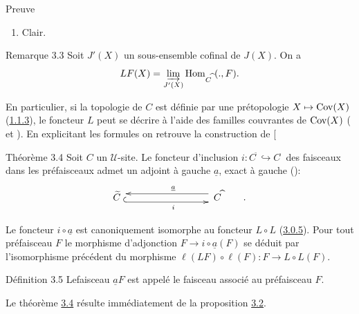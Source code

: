 \documentclass[10pt]{../fichiers-configuration-latex/smfart}
\begin{document}
\begin{enonce*}[remark]{Preuve}
\begin{enumerate}
\item Clair.
\end{enumerate}
\end{enonce*}

\begin{enonce*}[remark]{Remarque 3.3}
Soit $J'(X)$ un sous-ensemble cofinal de $J(X)$. On a
$$
LF(X)=\varinjlim_{J'(X)}\operatorname{Hom}_{C^{\widehat{\phantom{,}}}}(.,
F){}.
$$

En particulier, si la topologie de $C$ est définie par une
prétopologie $X\mapsto \operatorname{Cov}(X)$ (\hyperref[II.subsubsec1.1.3]{1.1.3}), le
foncteur $L$ peut se décrire à l'aide des familles couvrantes de
$\operatorname{Cov}(X)$ ( et ). En explicitant les
formules on retrouve la construction de [
\end{enonce*}

\begin{enonce*}{Théorème 3.4}
Soit $C$ un $𝒰$-site. Le foncteur d'inclusion
$i:C^{\widetilde{\phantom{,}}}\hookrightarrow
C^{\widehat{\phantom{,}}}$ des faisceaux dans les préfaisceaux
admet un adjoint à gauche $\underline{a}$, exact à gauche ():
\[
\xymatrix@=3cm@M=.2cm{
 \widetilde{C}  \ar @{^{(}->} @<-1ex>[r]_{i} & C^{\widehat{\phantom{,}}} \ar@<-1ex>[l]_{\underline{a}}
\qquad .}
\]

Le foncteur $i\circ \underline{a}$ est canoniquement isomorphe au foncteur
$L\circ L$ (\cf \hyperref[II.subsubsec3.0.5]{3.0.5}). Pour tout préfaisceau
$F$ le morphisme d'adjonction $F\rightarrow i\circ \underline{a}(F)$ se
déduit par l'isomorphisme précédent du morphisme
$\ell(LF)\circ\ell(F):F\rightarrow L\circ L(F)$.
\end{enonce*}

\begin{enonce*}{Définition 3.5}
Le\pageoriginale faisceau $\underline{a}F$ est appelé le faisceau
associé au préfaisceau $F$.
\end{enonce*}

Le théorème \hyperref[II.theo3.4]{3.4} résulte immédiatement de la
proposition \hyperref[II.prop3.2]{3.2}.
\end{document}
